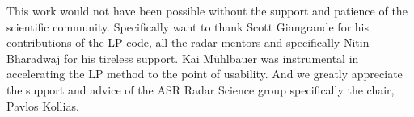 \documentclass[twocol]{ametsoc}
\begin{document}

\acknowledgments{}
This work would not have been possible without the support and patience of the scientific community. Specifically want to thank Scott Giangrande for his contributions of the LP code, all the radar mentors and specifically Nitin Bharadwaj for his tireless support. Kai M{\"u}hlbauer was instrumental in accelerating the LP method to the point of usability. And we greatly appreciate the support and advice of the  ASR Radar Science group specifically the chair, Pavlos Kollias. 

%
%
%






\end{document}
